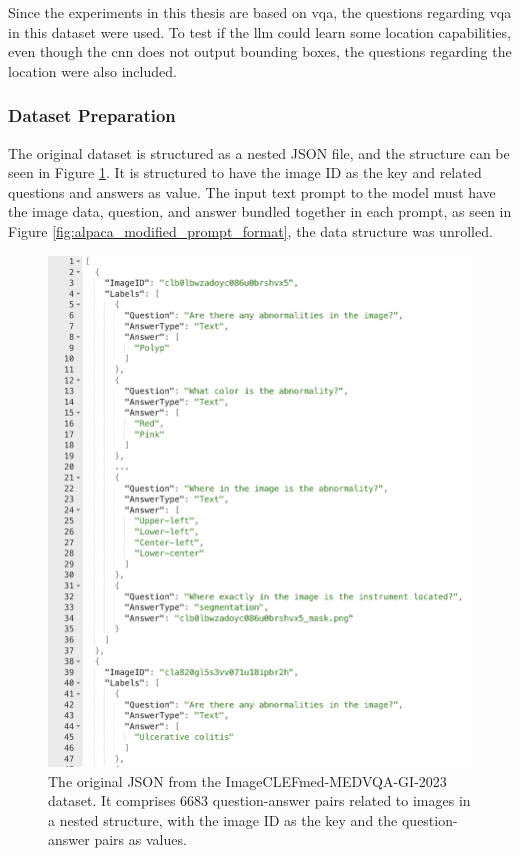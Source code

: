         Since the experiments in this thesis are based on \gls{vqa}, the questions regarding \gls{vqa} in this dataset were used. To test if the \gls{llm} could learn some location capabilities, even though the \gls{cnn} does not output bounding boxes, the questions regarding the location were also included. 
        

        \subsubsection{Dataset Preparation}
        
        The original dataset is structured as a nested JSON file, and the structure can be seen in Figure \ref{fig:colon_vqa_original_json}.
        It is structured to have the image ID as the key and related questions and answers as value. The input text prompt to the model must have the image data, question, and answer bundled together in each prompt, as seen in Figure \ref{fig:alpaca_modified_prompt_format}, the data structure was unrolled. 


        \begin{figure}[htb]
            \centering
            \centerline{
            \includegraphics[width=1.2\textwidth]{images/colon_vqa_original_json.png}}
            \caption{The original JSON from the ImageCLEFmed-MEDVQA-GI-2023 dataset. It comprises 6683 question-answer pairs related to images in a nested structure, with the image ID as the key and the question-answer pairs as values.}
            \label{fig:colon_vqa_original_json}
        \end{figure}



